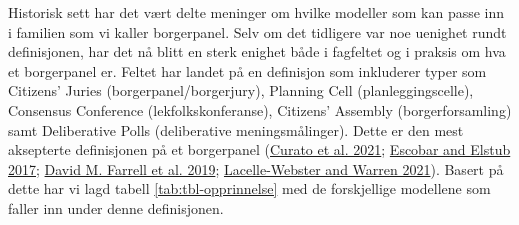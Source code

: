\documentclass[
  12pt,
  a4paper, 12pt]{article}
\begin{document}
Historisk sett har det vært delte meninger om hvilke modeller som kan passe inn i familien som vi kaller borgerpanel. Selv om det tidligere var noe uenighet rundt definisjonen, har det nå blitt en sterk enighet både i fagfeltet og i praksis om hva et borgerpanel er. Feltet har landet på en definisjon som inkluderer typer som Citizens' Juries (borgerpanel/borgerjury), Planning Cell (planleggingscelle), Consensus Conference (lekfolkskonferanse), Citizens' Assembly (borgerforsamling) samt Deliberative Polls (deliberative meningsmålinger). Dette er den mest aksepterte definisjonen på et borgerpanel (\protect\hyperlink{ref-curato_deliberative_2021}{Curato et al. 2021}; \protect\hyperlink{ref-escobar_forms_2017}{Escobar and Elstub 2017}; \protect\hyperlink{ref-farrell_deliberative_2019}{David M. Farrell et al. 2019}; \protect\hyperlink{ref-lacelle-webster_citizens_2021}{Lacelle-Webster and Warren 2021}). Basert på dette har vi lagd tabell \ref{tab:tbl-opprinnelse} med de forskjellige modellene som faller inn under denne definisjonen.
\end{document}
